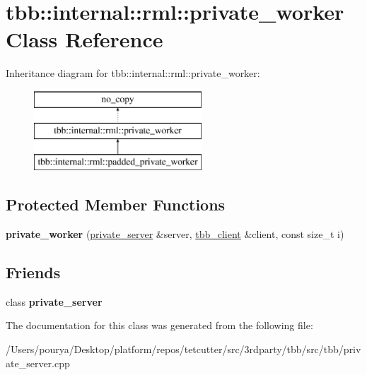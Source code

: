 \hypertarget{classtbb_1_1internal_1_1rml_1_1private__worker}{}\section{tbb\+:\+:internal\+:\+:rml\+:\+:private\+\_\+worker Class Reference}
\label{classtbb_1_1internal_1_1rml_1_1private__worker}
Inheritance diagram for tbb\+:\+:internal\+:\+:rml\+:\+:private\+\_\+worker\+:\begin{figure}[H]
\begin{center}
\leavevmode
\includegraphics[height=3.000000cm]{classtbb_1_1internal_1_1rml_1_1private__worker}
\end{center}
\end{figure}
\subsection*{Protected Member Functions}
\begin{DoxyCompactItemize}
\item 
\hypertarget{classtbb_1_1internal_1_1rml_1_1private__worker_aabf8c53453ec333ca4efcd3902cd5edc}{}{\bfseries private\+\_\+worker} (\hyperlink{classtbb_1_1internal_1_1rml_1_1private__server}{private\+\_\+server} \&server, \hyperlink{classtbb_1_1internal_1_1rml_1_1tbb__client}{tbb\+\_\+client} \&client, const size\+\_\+t i)\label{classtbb_1_1internal_1_1rml_1_1private__worker_aabf8c53453ec333ca4efcd3902cd5edc}

\end{DoxyCompactItemize}
\subsection*{Friends}
\begin{DoxyCompactItemize}
\item 
\hypertarget{classtbb_1_1internal_1_1rml_1_1private__worker_ab2148ff648505b5cfc4e67de39af10e8}{}class {\bfseries private\+\_\+server}\label{classtbb_1_1internal_1_1rml_1_1private__worker_ab2148ff648505b5cfc4e67de39af10e8}

\end{DoxyCompactItemize}


The documentation for this class was generated from the following file\+:\begin{DoxyCompactItemize}
\item 
/\+Users/pourya/\+Desktop/platform/repos/tetcutter/src/3rdparty/tbb/src/tbb/private\+\_\+server.\+cpp\end{DoxyCompactItemize}
